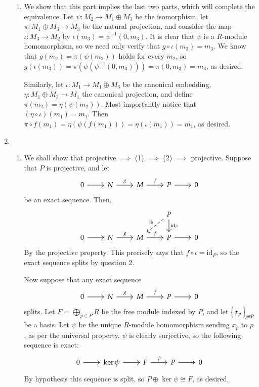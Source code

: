 \documentclass[12pt]{article}
\theoremstyle{definitionstyle}
\newcommand{\id}{\mathrm{id}}
\begin{document}
\begin{enumerate}
\begin{enumerate}
			\item We show that this part implies the last two parts, which will complete the equivalence. Let $\psi: M_2 \to M_1 \oplus M_3$ be the isomorphism, let $\pi: M_1 \oplus M_3 \to M_3$ be the natural projection, and consider the map $\iota: M_3 \to M_2$ by $\iota(m_3) = \psi^{-1}(0, m_3)$. It is clear that $\psi$ is a $R$-module homomorphism, so we need only verify that $g \circ \iota(m_3) = m_3$. We know that $g(m_2) = \pi(\psi(m_2))$ holds for every $m_2$, so $g(\iota(m_3)) = \pi(\psi(\psi^{-1}(0, m_3))) = \pi(0, m_3) = m_3$, as desired.
			
			Similarly, let $\iota: M_1 \to M_1 \oplus M_3$ be the canonical embedding, $\eta: M_1 \oplus M_3 \to M_1$ the canonical projection, and define $\pi(m_2) = \eta(\psi(m_2))$. Most importantly notice that $(\eta \circ \iota)(m_1) = m_1$. Then $\pi \circ f(m_1) = \eta(\psi(f(m_1))) = \eta(\iota(m_1)) = m_1$, as desired.
		\end{enumerate}
	
		\item \begin{enumerate}

			\item We shall show that projective $\implies$ (1) $\implies$ (2) $\implies$ projective. Suppose that $P$ is projective, and let 
			\[\begin{tikzcd}
				0 & N & M & P & 0
				\arrow[from=1-4, to=1-5]
				\arrow["f", from=1-3, to=1-4]
				\arrow["g", from=1-2, to=1-3]
				\arrow[from=1-1, to=1-2]
			\end{tikzcd}\]
			be an exact sequence. Then,
			\[\begin{tikzcd}
				&&& P \\
				0 & N & M & P & 0
				\arrow[from=2-4, to=2-5]
				\arrow["f", from=2-3, to=2-4]
				\arrow["g", from=2-2, to=2-3]
				\arrow[from=2-1, to=2-2]
				\arrow["{\mathrm{id}_P}", from=1-4, to=2-4]
				\arrow["{\exists \iota}"', dashed, from=1-4, to=2-3]
			\end{tikzcd}\]
			By the projective property. This precisely says that $f \circ \iota = \id_P$, so the exact sequence splits by question 2.
			
			Now suppose that any exact sequence \[\begin{tikzcd}
				0 & N & M & P & 0
				\arrow[from=1-4, to=1-5]
				\arrow["f", from=1-3, to=1-4]
				\arrow["g", from=1-2, to=1-3]
				\arrow[from=1-1, to=1-2]
			\end{tikzcd}\]
			splits. Let $F = \bigoplus_{p \in P} R$ be the free module indexed by $P$, and let $\Set{x_p}_{p \in P}$ be a basis. Let $\psi$ be the unique $R$-module homomorphism sending $x_p$ to $p$, as per the universal property. $\psi$ is clearly surjective, so the following sequence is exact:
			\[\begin{tikzcd}
				0 & {\ker \psi} & F & P & 0
				\arrow[from=1-1, to=1-2]
				\arrow[from=1-2, to=1-3]
				\arrow["\psi", from=1-3, to=1-4]
				\arrow[from=1-4, to=1-5]
			\end{tikzcd}\]
			By hypothesis this sequence is split, so $P \oplus \ker \psi \cong F$, as desired.
			

\end{enumerate}
\end{enumerate}
\end{document}
